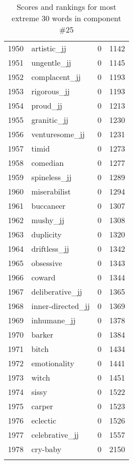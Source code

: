 \begin{longtable}[!htbp]{| rlr@{.}l |}
    1950 & artistic\_jj & 0 & 1142 \\
    1951 & ungentle\_jj & 0 & 1145 \\
    1952 & complacent\_jj & 0 & 1193 \\
    1953 & rigorous\_jj & 0 & 1193 \\
    1954 & proud\_jj & 0 & 1213 \\
    1955 & granitic\_jj & 0 & 1230 \\
    1956 & venturesome\_jj & 0 & 1231 \\
    1957 & timid & 0 & 1273 \\
    1958 & comedian & 0 & 1277 \\
    1959 & spineless\_jj & 0 & 1289 \\
    1960 & miserabilist & 0 & 1294 \\
    1961 & buccaneer & 0 & 1307 \\
    1962 & mushy\_jj & 0 & 1308 \\
    1963 & duplicity & 0 & 1320 \\
    1964 & driftless\_jj & 0 & 1342 \\
    1965 & obsessive & 0 & 1343 \\
    1966 & coward & 0 & 1344 \\
    1967 & deliberative\_jj & 0 & 1365 \\
    1968 & inner-directed\_jj & 0 & 1369 \\
    1969 & inhumane\_jj & 0 & 1378 \\
    1970 & barker & 0 & 1384 \\
    1971 & bitch & 0 & 1434 \\
    1972 & emotionality & 0 & 1441 \\
    1973 & witch & 0 & 1451 \\
    1974 & sissy & 0 & 1522 \\
    1975 & carper & 0 & 1523 \\
    1976 & eclectic & 0 & 1526 \\
    1977 & celebrative\_jj & 0 & 1557 \\
    1978 & cry-baby & 0 & 2150 \\
    \hline
    \caption{Scores and rankings for most extreme 30 words in component \#25} \\
\end{longtable}

